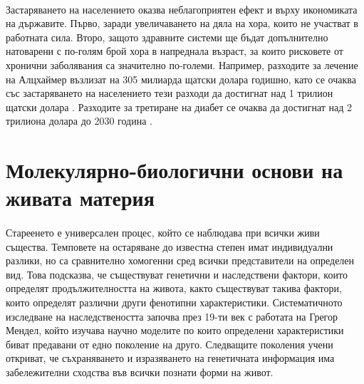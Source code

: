 \documentclass[pdftex,cyrillic,14pt,a4page,twoside,openright]{extreport}
\begin{document}
\paragraph{}
Застаряването на населението оказва неблагоприятен ефект и върху икономиката на държавите. Първо, заради увеличаването на дяла на хора, които не участват в работната сила. Второ, защото здравните системи ще бъдат допълнително натоварени с по-голям брой хора в напреднала възраст, за които рисковете от хронични заболявания са значително по-големи. Например, разходите за лечение на Алцхаймер възлизат на 305 милиарда щатски долара годишно, като се очаква със застаряването на населението тези разходи да достигнат над 1 трилион щатски долара \cite{wong2020}. Разходите за третиране на диабет се очаква да достигнат над 2 трилиона долара до 2030 година \cite{bommer2018}.

\section[Молекулярно-биологични основи на живата материя]{Молекулярно-биологични основи на\\ живата материя}\label{sec:basic_genetics}

\paragraph{}
Стареенето е универсален процес, който се наблюдава при всички живи същества. Темповете на остаряване до известна степен имат индивидуални разлики, но са сравнително хомогенни сред всички представители на определен вид. Това подсказва, че съществуват генетични и наследствени фактори, които определят продължителността на живота, както съществуват такива фактори, които определят различни други фенотипни характеристики. Систематичното изследване на наследствеността започва през 19-ти век с работата на Грегор Мендел, който изучава научно моделите по които определени характеристики биват предавани от едно поколение на друго. Следващите поколения учени откриват, че съхраняването и изразяването на генетичната информация има забележителни сходства във всички познати форми на живот.
\end{document}
